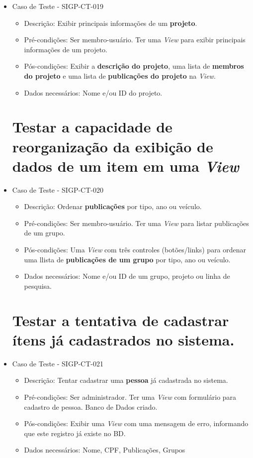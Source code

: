 \documentclass[11pt, a4paper]{book}
\begin{document}
\begin{itemize}
	\item Caso de Teste - SIGP-CT-019
	\begin{itemize}
	\item Descrição: Exibir principais informações de um \textbf{projeto}.
	\item Pré-condições: Ser membro-usuário. Ter uma \emph{View} para exibir principais informações de um projeto.
	\item Pós-condições: Exibir a \textbf{descrição do projeto}, uma lista de \textbf{membros do projeto} e uma lista de \textbf{publicações do projeto} na \emph{View}.
	\item Dados necessários: Nome e/ou ID do projeto.
	\end{itemize}

\newpage
\section{Testar a capacidade de reorganização da exibição de dados de um item em uma \emph{View}}

	\item Caso de Teste - SIGP-CT-020
	\begin{itemize}
	\item Descrição: Ordenar \textbf{publicações} por tipo, ano ou veículo.
	\item Pré-condições: Ser membro-usuário. Ter uma \emph{View} para listar publicações de um grupo.
	\item Pós-condições: Uma \emph{View} com três controles (botões/links) para ordenar uma llista de \textbf{publicações de um grupo} por tipo, ano ou veículo.
	\item Dados necessários: Nome e/ou ID de um grupo, projeto ou linha de pesquisa.
	\end{itemize}

\newpage
\section{Testar a tentativa de cadastrar ítens já cadastrados no sistema.}

	\item Caso de Teste - SIGP-CT-021
	\begin{itemize}
	\item Descrição: Tentar cadastrar uma \textbf{pessoa} já cadastrada no sistema.
	\item Pré-condições: Ser administrador. Ter uma \emph{View} com formulário para cadastro de pessoa. Banco de Dados criado.
	\item Pós-condições: Exibir uma \emph{View} com uma mensagem de erro, informando que este registro já existe no BD.
	\item Dados necessários: Nome, CPF, Publicações, Grupos
	\end{itemize}



\end{itemize}
\end{document}
